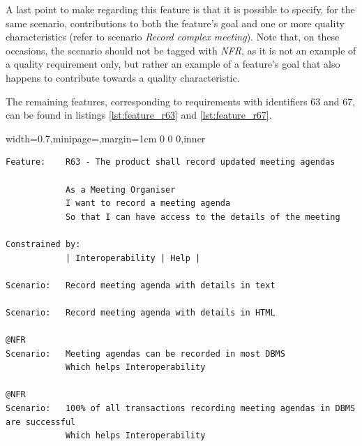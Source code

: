 \documentclass[dissertation,final]{softeng}
\newenvironment{featurecode}[1]
{ \lrbox\featurebox \begin{adjustbox}{width=#1\textwidth,minipage=\textwidth,margin=1cm 0 0 0,inner} }
{ \end{adjustbox}\endlrbox}
\newenvironment{featurelist}[2]
{
\newcommand{\setcaption}{\caption{#1}}
\newcommand{\setlabel}{\label{#2}}
}
{\begin{listing}[h!]\centering\usebox\featurebox\setcaption\setlabel\end{listing}}
\begin{document}
A last point to make regarding this feature is that it is possible to specify, for the same scenario, contributions to both the feature's goal and one or more quality characteristics (refer to scenario \emph{Record complex meeting}). Note that, on these occasions, the scenario should not be tagged with \emph{NFR}, as it is not an example of a quality requirement only, but rather an example of a feature's goal that also happens to contribute towards a quality characteristic.

The remaining features, corresponding to requirements with identifiers 63 and 67, can be found in listings \ref{lst:feature_r63} and \ref{lst:feature_r67}.

\begin{featurelist}{Changes to Gherkin -- R63 -- The product shall record updated meeting agendas}{lst:feature_r63}
\begin{featurecode}{0.7}
\begin{verbatim}
Feature:    R63 - The product shall record updated meeting agendas

            As a Meeting Organiser
            I want to record a meeting agenda
            So that I can have access to the details of the meeting
	
Constrained by:
            | Interoperability | Help |

Scenario:   Record meeting agenda with details in text

Scenario:   Record meeting agenda with details in HTML

@NFR	
Scenario:   Meeting agendas can be recorded in most DBMS
            Which helps Interoperability

@NFR	
Scenario:   100% of all transactions recording meeting agendas in DBMS are successful
            Which helps Interoperability
\end{verbatim}
\end{featurecode}
\end{featurelist}
\end{document}
